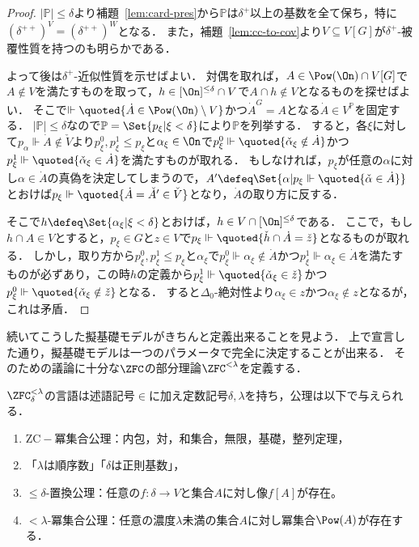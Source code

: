 \documentclass[a4j,leqno]{ltjsarticle}
\theoremstyle{nonumberplain}
\begin{document}
\begin{proof}
 $|\mathbb{P}| \leq \delta$より補題~\ref{lem:card-pres}から$\mathbb{P}$は$\delta^+$以上の基数を全て保ち，特に$(\delta^{++})^V = (\delta^{++})^W$となる．
 また，補題~\ref{lem:cc-to-cov}より$V \subseteq V[G]$が$\delta^+$-被覆性質を持つのも明らかである．

 よって後は$\delta^+$-近似性質を示せばよい．
 対偶を取れば，$A \in \Pow(\On) \cap V[G]$で$A \notin V$を満たすものを取って，$h \in [\On]^{\leq \delta} \cap V$で$A \cap h \notin V$となるものを探せばよい．
 そこで$\Vdash \quoted{\dot{A} \in \Pow(\On) \setminus V}$かつ$\dot{A}^G = A$となる$\dot{A} \in V^{\mathbb{P}}$を固定する．
 $|\mathbb{P}| \leq \delta$なので$\mathbb{P} = \Set{p_\xi | \xi < \delta}$により$\mathbb{P}$を列挙する．
 すると，各$\xi$に対して$p_\alpha \Vdash \dot{A} \notin \check{V}$より$p_\xi^0, p_\xi^1 \leq p_\xi$と$\alpha_\xi \in \On$で$p_\xi^0 \Vdash\quoted{ \check{\alpha}_\xi \notin \dot{A}}$かつ$p_\xi^1 \Vdash \quoted{\check{\alpha}_\xi \in \dot{A}}$を満たすものが取れる．
 もしなければ，$p_\xi$が任意の$\alpha$に対し$\alpha \in \dot{A}$の真偽を決定してしまうので，$A' \defeq \Set{ \alpha | p_\xi \Vdash \quoted{\check{\alpha} \in \dot{A}}}$とおけば$p_\xi \Vdash \quoted{\dot{A} = \check{A}' \in \check{V}}$となり，$\dot{A}$の取り方に反する．

 そこで$h \defeq \Set{\alpha_\xi | \xi < \delta}$とおけば，$h \in V \cap [\On]^{\leq \delta}$である．
 ここで，もし$h \cap A \in V$とすると，$p_\xi \in G$と$z \in V$で$p_\xi \Vdash \quoted{\check{h} \cap \dot{A} = \check{z}}$となるものが取れる．
 しかし，取り方から$p_\xi^0, p_\xi^1 \leq p_\xi$と$\alpha_\xi$で$p_\xi^0 \Vdash \alpha_\xi \notin \dot{A}$かつ$p_\xi^1 \Vdash \alpha_\xi \in \dot{A}$を満たすものが必ずあり，この時$h$の定義から$p_\xi^1 \Vdash \quoted{\check{\alpha}_\xi \in \check{z}}$かつ$p_\xi^0 \Vdash \quoted{\check{\alpha}_\xi \notin \check{z}}$となる．
 すると$\Delta_0$-絶対性より$\alpha_\xi \in z$かつ$\alpha_\xi \notin z$となるが，これは矛盾．
\end{proof}
続いてこうした擬基礎モデルがきちんと定義出来ることを見よう．
上で宣言した通り，擬基礎モデルは一つのパラメータで完全に決定することが出来る．
そのための議論に十分な$\ZFC$の部分理論$\ZFC^{<\lambda}$を定義する．
\begin{definition}[$\ZFC^{<\lambda}$]
 $\ZFC^{<\lambda}_\delta$の言語は述語記号$\in$に加え定数記号$\delta, \lambda$を持ち，公理は以下で与えられる．
 \begin{enumerate}
  \item $\mathrm{ZC}-$冪集合公理：内包，対，和集合，無限，基礎，整列定理，
  \item 「$\lambda$は順序数」「$\delta$は正則基数」，
  \item ${\leq}\delta$-置換公理：任意の$f: \delta \to V$と集合$A$に対し像$f[A]$が存在。
  \item ${<}\lambda$-冪集合公理：任意の濃度$\lambda$未満の集合$A$に対し冪集合$\Pow(A)$が存在する．
 \end{enumerate}
\end{definition}
\end{document}
